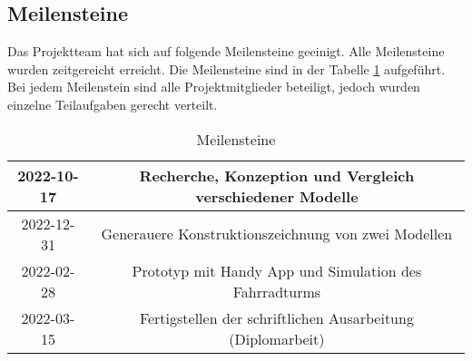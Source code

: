 \subsection{Meilensteine}
Das Projektteam hat sich auf folgende Meilensteine geeinigt. Alle Meilensteine wurden zeitgereicht erreicht. Die Meilensteine sind in der Tabelle \ref{tab:meilensteine} aufgeführt. Bei jedem Meilenstein sind alle Projektmitglieder beteiligt, jedoch wurden einzelne Teilaufgaben gerecht verteilt.

\begin{table}[ht]
  \begin{center}
    \begin{tabular} { |c|c| }
      \hline
      2022-10-17 & Recherche, Konzeption und Vergleich verschiedener Modelle   \\
      \hline
      2022-12-31 & Generauere Konstruktionszeichnung von zwei Modellen         \\
      \hline
      2022-02-28 & Prototyp mit Handy App und Simulation des Fahrradturms      \\
      \hline
      2022-03-15 & Fertigstellen der schriftlichen Ausarbeitung (Diplomarbeit) \\
      \hline
    \end{tabular}
    \caption{Meilensteine}
    \label{tab:meilensteine}
  \end{center}
\end{table}